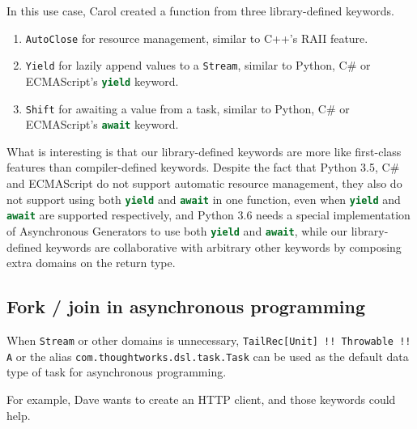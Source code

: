In this use case, Carol created a function from three library-defined keywords.

\begin{enumerate}
  \item \lstinline{AutoClose} for resource management, similar to C++'s RAII feature.
  \item \lstinline{Yield} for lazily append values to a \lstinline{Stream}, similar to Python, C\# or ECMAScript's \lstinline[language=Python]{yield} keyword.
  \item \lstinline{Shift} for awaiting a value from a task, similar to Python, C\# or ECMAScript's \lstinline[language=Python]{await} keyword.
\end{enumerate}

What is interesting is that our library-defined keywords are more like first-class features than compiler-defined keywords. Despite the fact that Python 3.5, C\# and ECMAScript do not support automatic resource management, they also do not support using both \lstinline[language=Python]{yield} and \lstinline[language=Python]{await} in one function, even when \lstinline[language=Python]{yield} and \lstinline[language=Python]{await} are supported respectively, and Python 3.6 needs a special implementation of Asynchronous Generators \cite{pep525} to use both \lstinline[language=Python]{yield} and \lstinline[language=Python]{await}, while our library-defined keywords are collaborative with arbitrary other keywords by composing extra domains on the return type.

\subsection{Fork / join in asynchronous programming}

When \lstinline{Stream} or other domains is unnecessary,  \lstinline{TailRec[Unit] !! Throwable !! A} or the alias \lstinline{com.thoughtworks.dsl.task.Task} can be used as the default data type of task for asynchronous programming.

For example, Dave wants to create an HTTP client, and those keywords could help.

